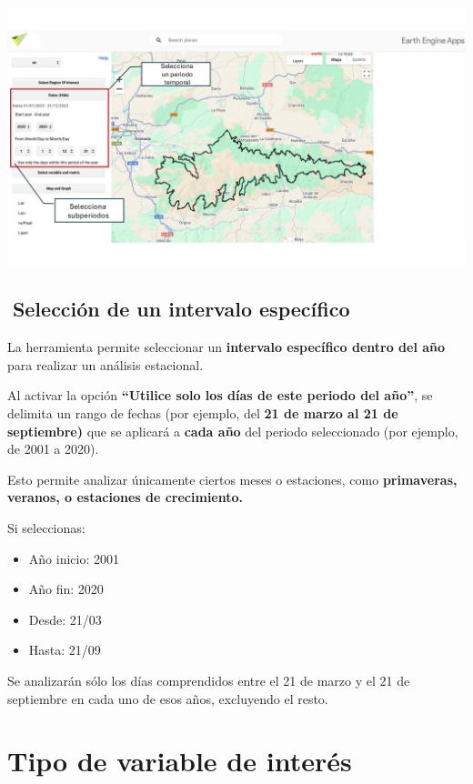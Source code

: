 \documentclass[
]{book}
\providecommand{\tightlist}{%
  \setlength{\itemsep}{0pt}\setlength{\parskip}{0pt}}
\begin{document}
\includegraphics{assets/dates_es.png}

\section{\texorpdfstring{\textbf{📆Selección de un intervalo específico}}{📆Selección de un intervalo específico}}\label{selecciuxf3n-de-un-intervalo-especuxedfico}

La herramienta permite seleccionar un \textbf{intervalo específico dentro del año} para realizar un análisis estacional.

Al activar la opción \textbf{``Utilice solo los días de este periodo del año''}, se delimita un rango de fechas (por ejemplo, del \textbf{21 de marzo al 21 de septiembre)} que se aplicará a \textbf{cada año} del periodo seleccionado (por ejemplo, de 2001 a 2020).

Esto permite analizar únicamente ciertos meses o estaciones, como \textbf{primaveras, veranos, o estaciones de crecimiento.}

Si seleccionas:

\begin{itemize}
\tightlist
\item
  Año inicio: 2001\\
\item
  Año fin: 2020\\
\item
  Desde: 21/03\\
\item
  Hasta: 21/09
\end{itemize}

Se analizarán sólo los días comprendidos entre el 21 de marzo y el 21 de septiembre en cada uno de esos años, excluyendo el resto.

\chapter{Tipo de variable de interés}\label{tipo-variable}
\end{document}
